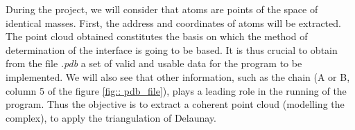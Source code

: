 During the project, we will consider that atoms are points of the space of identical masses.
First, the address and coordinates of atoms will be extracted.
The point cloud obtained constitutes the basis on which the
method of determination of the interface is going to be based. It is thus crucial
to obtain from the file \textit{.pdb } a set of valid and usable data
for the program to be implemented. We will also see that other information, such as
 the chain (A or B, column 5 of the figure \ref{fig:: pdb_file}),
  plays a leading role in the running of the program. Thus the objective is
   to extract a coherent point cloud (modelling the complex), to apply
    the triangulation of Delaunay.
